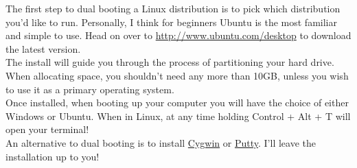 The first step to dual booting a Linux distribution is to pick which distribution you'd like to run.  Personally, I think for beginners Ubuntu is the most familiar and simple to use.  Head on over to \url{http://www.ubuntu.com/desktop} to download the latest version.\\

The install will guide you through the process of partitioning your hard drive.  When allocating space, you shouldn't need any more than 10GB, unless you wish to use it as a primary operating system.\\

Once installed, when booting up your computer you will have the choice of either Windows or Ubuntu.  When in Linux, at any time holding Control + Alt + T will open your terminal!\\

An alternative to dual booting is to install \href{http://www.cygwin.com/}{Cygwin} or \href{http://www.putty.org/}{Putty}.  I'll leave the installation up to you!



